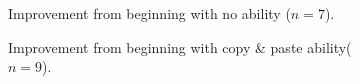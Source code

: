 \documentclass[10pt, twocolumn]{article}
\begin{document}
\begin{figure}[t]
\centering
	\begin{subfigure}[c]{2.1in}
		\centering
    	\caption{
    	Improvement from beginning with no ability ($n=7$).
    	}
    	\label{shellDetailSkill1}
    \end{subfigure}
    \begin{subfigure}[c]{2.1in}
        \centering
    	\caption{
    	Improvement from beginning with copy \& paste ability($n=9$).
    	}
    	\label{shellDetailSkill2}
    \end{subfigure}
    \begin{subfigure}[c]{2.1in}
    	\centering

\end{subfigure}
\end{figure}
\end{document}
